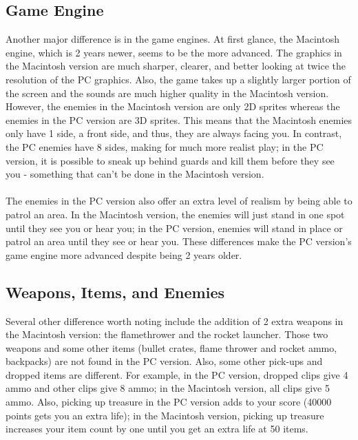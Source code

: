 \documentclass[book.tex]{subfiles}
\begin{document}
\subsection{Game Engine}
Another major difference is in the game engines. At first glance, the Macintosh engine, which is 2 years newer, seems to be the more advanced. The graphics in the Macintosh version are much sharper, clearer, and better looking at twice the resolution of the PC graphics. Also, the game takes up a slightly larger portion of the screen and the sounds are much higher quality in the Macintosh version.\\
However, the enemies in the Macintosh version are only 2D sprites whereas the enemies in the PC version are 3D sprites. This means that the Macintosh enemies only have 1 side, a front side, and thus, they are always facing you. In contrast, the PC enemies have 8 sides, making for much more realist play; in the PC version, it is possible to sneak up behind guards and kill them before they see you - something that can't be done in the Macintosh version.\\
\\
The enemies in the PC version also offer an extra level of realism by being able to patrol an area. In the Macintosh version, the enemies will just stand in one spot until they see you or hear you; in the PC version, enemies will stand in place or patrol an area until they see or hear you. These differences make the PC version's game engine more advanced despite being 2 years older.\\

\subsection{Weapons, Items, and Enemies}

Several other difference worth noting include the addition of 2 extra weapons in the Macintosh version: the flamethrower and the rocket launcher. Those two weapons and some other items (bullet crates, flame thrower and rocket ammo, backpacks) are not found in the PC version.
Also, some other pick-ups and dropped items are different. For example, in the PC version, dropped clips give 4 ammo and other clips give 8 ammo; in the Macintosh version, all clips give 5 ammo. Also, picking up treasure in the PC version adds to your score (40000 points gets you an extra life); in the Macintosh version, picking up treasure increases your item count by one until you get an extra life at 50 items.
\end{document}
